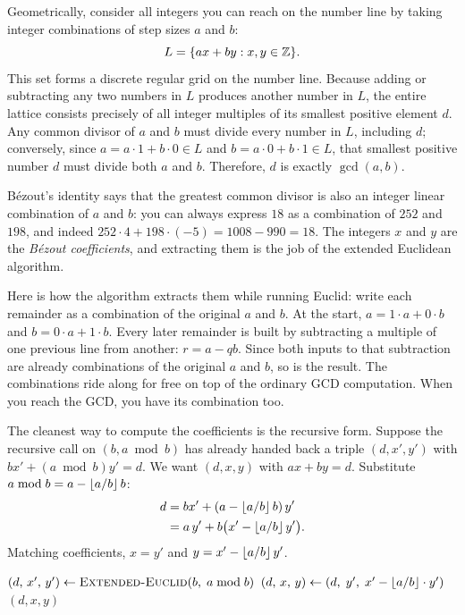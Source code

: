 \begin{intuitionbox}
Geometrically, consider all integers you can reach on the number line by
taking integer combinations of step sizes $a$ and $b$:
\[
L = \{ax + by : x, y \in \mathbb{Z}\} .
\]
This set forms a discrete regular grid on the number line. Because adding or subtracting any two numbers in $L$ produces
another number in $L$, the entire lattice consists precisely of all integer
multiples of its smallest positive element $d$. Any common divisor of $a$ and
$b$ must divide every number in $L$, including $d$; conversely, since $a = a\cdot
1 + b\cdot 0 \in L$ and $b = a\cdot 0 + b\cdot 1 \in L$, that smallest positive
number $d$ must divide both $a$ and $b$. Therefore, $d$ is exactly
$\gcd(a,b)$.

B\'ezout's identity says that the greatest common divisor is also an integer
linear combination of $a$ and $b$: you can always express $18$ as a
combination of $252$ and $198$, and indeed $252 \cdot 4 + 198 \cdot (-5) = 1008
- 990 = 18$. The integers $x$ and $y$ are the \emph{B\'ezout coefficients}, and
extracting them is the job of the extended Euclidean algorithm.
\end{intuitionbox}

Here is how the algorithm extracts them while running Euclid: write each
remainder as a combination of the original $a$ and $b$. At the start, $a =
1\cdot a + 0 \cdot b$ and $b = 0\cdot a + 1\cdot b$. Every later remainder is
built by subtracting a multiple of one previous line from another: $r = a - qb$.
Since both inputs to that subtraction are already combinations of the original
$a$ and $b$, so is the result. The combinations ride along for free on top of
the ordinary GCD computation. When you reach the GCD, you have its combination
too.

The cleanest way to compute the coefficients is the recursive form. Suppose the
recursive call on $(b, a \bmod b)$ has already handed back a triple $(d, x', y')$
with $b x' + (a \bmod b) y' = d$. We want $(d, x, y)$ with $a x + b y = d$.
Substitute $a \bmod b = a - \lfloor a/b\rfloor\, b$:
\begin{align*}
  d &= b x' + (a - \lfloor a/b\rfloor\,b)\,y' \\
    &= a\,y' + b\bigl(x' - \lfloor a/b\rfloor\,y'\bigr).
\end{align*}
Matching coefficients, $x = y'$ and $y = x' - \lfloor a/b\rfloor\,y'$.

\begin{algorithm}[H]
\caption{\textsc{Extended-Euclid}$(a,b)$}
\label{ch30:alg-exteuclid}
$(d,\, x',\, y') \leftarrow \textsc{Extended-Euclid}(b,\; a \bmod b)$\;
$(d,\, x,\, y) \leftarrow (d,\; y',\; x' - \lfloor a/b\rfloor\cdot y')$\;
\Return $(d,x,y)$\;
\end{algorithm}

